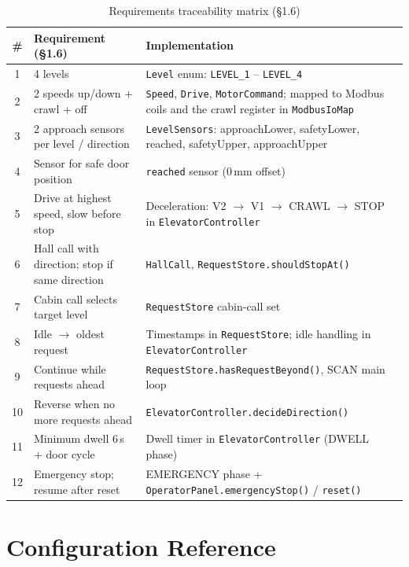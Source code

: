 \documentclass[12pt,a4paper]{article}
\begin{document}
\begin{table}[H]
\centering
\begin{tabularx}{\textwidth}{clX}
\toprule
\textbf{\#} & \textbf{Requirement (§1.6)} & \textbf{Implementation} \\
\midrule
1  & 4 levels
   & \texttt{Level} enum: \texttt{LEVEL\_1} -- \texttt{LEVEL\_4} \\
2  & 2 speeds up/down + crawl + off
   & \texttt{Speed}, \texttt{Drive}, \texttt{MotorCommand}; mapped to Modbus coils and the crawl register in \texttt{ModbusIoMap} \\
3  & 2 approach sensors per level / direction
   & \texttt{LevelSensors}: approachLower, safetyLower, reached, safetyUpper, approachUpper \\
4  & Sensor for safe door position
   & \texttt{reached} sensor (0\,mm offset) \\
5  & Drive at highest speed, slow before stop
   & Deceleration: V2 $\to$ V1 $\to$ CRAWL $\to$ STOP in \texttt{ElevatorController} \\
6  & Hall call with direction; stop if same direction
   & \texttt{HallCall}, \texttt{RequestStore.shouldStopAt()} \\
7  & Cabin call selects target level
   & \texttt{RequestStore} cabin-call set \\
8  & Idle $\to$ oldest request
   & Timestamps in \texttt{RequestStore}; idle handling in \texttt{ElevatorController} \\
9  & Continue while requests ahead
   & \texttt{RequestStore.hasRequestBeyond()}, SCAN main loop \\
10 & Reverse when no more requests ahead
   & \texttt{ElevatorController.decideDirection()} \\
11 & Minimum dwell 6\,s + door cycle
   & Dwell timer in \texttt{ElevatorController} (DWELL phase) \\
12 & Emergency stop; resume after reset
   & EMERGENCY phase + \texttt{OperatorPanel.emergencyStop()} / \texttt{reset()} \\
\bottomrule
\end{tabularx}
\caption{Requirements traceability matrix (§1.6)}
\end{table}

\section{Configuration Reference}
\end{document}
